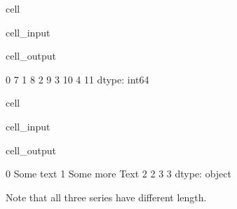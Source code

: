 \documentclass[letterpaper,10pt,english]{jupyterBook}
\begin{document}
\begin{sphinxuseclass}{cell}\begin{sphinxVerbatimInput}

\begin{sphinxuseclass}{cell_input}
\begin{sphinxVerbatim}[commandchars=\\\{\}]
\end{sphinxVerbatim}

\end{sphinxuseclass}\end{sphinxVerbatimInput}
\begin{sphinxVerbatimOutput}

\begin{sphinxuseclass}{cell_output}
\begin{sphinxVerbatim}[commandchars=\\\{\}]
0     7
1     8
2     9
3    10
4    11
dtype: int64
\end{sphinxVerbatim}

\end{sphinxuseclass}\end{sphinxVerbatimOutput}

\end{sphinxuseclass}
\begin{sphinxuseclass}{cell}\begin{sphinxVerbatimInput}

\begin{sphinxuseclass}{cell_input}
\begin{sphinxVerbatim}[commandchars=\\\{\}]
\end{sphinxVerbatim}

\end{sphinxuseclass}\end{sphinxVerbatimInput}
\begin{sphinxVerbatimOutput}

\begin{sphinxuseclass}{cell_output}
\begin{sphinxVerbatim}[commandchars=\\\{\}]
0         Some text
1    Some more Text
2                 2
3                 3
dtype: object
\end{sphinxVerbatim}

\end{sphinxuseclass}\end{sphinxVerbatimOutput}

\end{sphinxuseclass}
\sphinxAtStartPar
Note that all three series have different length.
\end{document}
